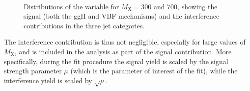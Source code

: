 \begin{figure}[!htb]
\\
\caption{
    Distributions of the \mti variable for $M_\mathrm{X}=$300 and 700\GeV, showing the signal (both the ggH and VBF mechanisms) and the interference contributions in the three jet categories.}
    \label{fig:mti_int}
\end{figure}

The interference contribution is thus not negligible, especially for large values of $M_\mathrm{X}$, and is included in the analysis as part of the signal contribution. More specifically, during the fit procedure the signal yield is scaled by the signal strength parameter $\mu$ (which is the parameter of interest of the fit), while the interference yield is scaled by $\sqrt{\mu}$.

